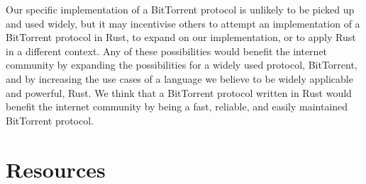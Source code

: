 \documentclass{acm_proc_article-sp}
\begin{document}
Our specific implementation of a BitTorrent protocol is unlikely to be picked up and used widely, but it may incentivise others to attempt an implementation of a BitTorrent protocol in Rust, to expand on our implementation, or to apply Rust in a different context.  Any of these possibilities would benefit the internet community by expanding the possibilities for a widely used protocol, BitTorrent, and by increasing the use cases of a language we believe to be widely applicable and powerful, Rust.  We think that a BitTorrent protocol written in Rust would benefit the internet community by being a fast, reliable, and easily maintained BitTorrent protocol.

\section{Resources}
\end{document}
